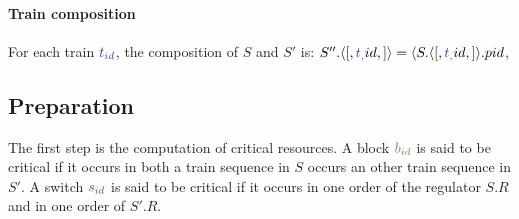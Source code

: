 \documentclass[runningheads]{llncs}
\newcommand{\tuple}[1]{\ensuremath{\langle #1\rangle}}
\newcommand{\posFmt}[1]{{\color{poscolor}{#1}}}
\newcommand{\bid}[1]{\ensuremath{\posFmt{b_{#1}}}}
\newcommand{\swFmt}[1]{{\color{swcolor}{#1}}}
\newcommand{\sid}[1]{\ensuremath{\swFmt{s_{#1}}}}
\newcommand{\trainFmt}[1]{{\color{traincolor} #1}}
\newcommand{\tid}[1]{\ensuremath{\trainFmt{t_{#1}}}}
\newcommand{\stateTuple}[4]{\tuple{#1, #2, #3, #4}}
\begin{document}
\paragraph{Train composition} For each train $\tid{id}$, the composition of $S$ and $S'$ is: $S''.\stateTuple[\tid{id}] = \langle S.\stateTuple[\tid{id}].pid$, 



\subsection{Preparation}

The first step is the computation of critical resources. A block $\bid{id}$ is said to be critical if it occurs in both a train sequence in $S$ occurs an other train sequence in $S'$. A switch $\sid{id}$ is said to be critical if it occurs in one order of the regulator $S.R$ and in one order of $S'.R$. 




\end{document}
